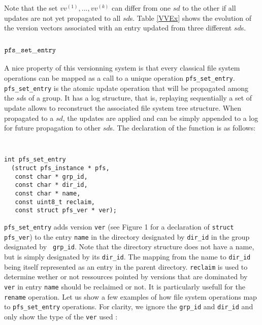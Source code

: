 Note that the set $vv^{(1)},..., vv^{(k)}$ can differ from one $sd$ to
the other if all updates are not yet propagated to all $sd$s. Table \ref{VVEx}
shows the evolution of the version vectors associated with an
entry updated from three different $sd$s.

\subsection {${\tt pfs\_set\_entry}$}

A nice property of this versionning system is that every classical
file system operations can be mapped as a call to a unique
operation {\tt pfs\_set\_entry}. {\tt pfs\_set\_entry} is the atomic
update operation that will be propagated among the $sd$s of a group.
It has a log structure, that is, replaying sequentially a set of update
allows to reconstruct the associated file system tree structure. When
propagated to a $sd$, the updates are applied and can be simply appended to a
log for future propagation to other $sd$s.  
The declaration of the function is as follows:

\begin{center}
{\tt \small
\begin{verbatim}
int pfs_set_entry 
  (struct pfs_instance * pfs,
   const char * grp_id,
   const char * dir_id,
   const char * name,
   const uint8_t reclaim,
   const struct pfs_ver * ver);
\end{verbatim}
}
\end{center}

{\tt pfs\_set\_entry} adds version {\tt ver} (see Figure 1 for a
declaration of {\tt struct pfs\_ver}) to the entry {\tt name} in the
directory designated by {\tt dir\_id} in the group designated by {\tt
  grp\_id}. Note that the directory structure does not have a name, but
is simply designated by its {\tt dir\_id}. The mapping from the name
to {\tt dir\_id} being itself represented as an entry in the parent
directory.  {\tt reclaim} is used to determine wether or not
ressources pointed by versions that are dominated by {\tt ver} in
entry {\tt name} should be reclaimed or not. It is particularly
usefull for the {\tt rename} operation. Let us show a few examples of
how file system operations map to {\tt pfs\_set\_entry}
operations. For clarity, we ignore the {\tt grp\_id} and {\tt dir\_id}
and only show the type of the {\tt ver} used :


